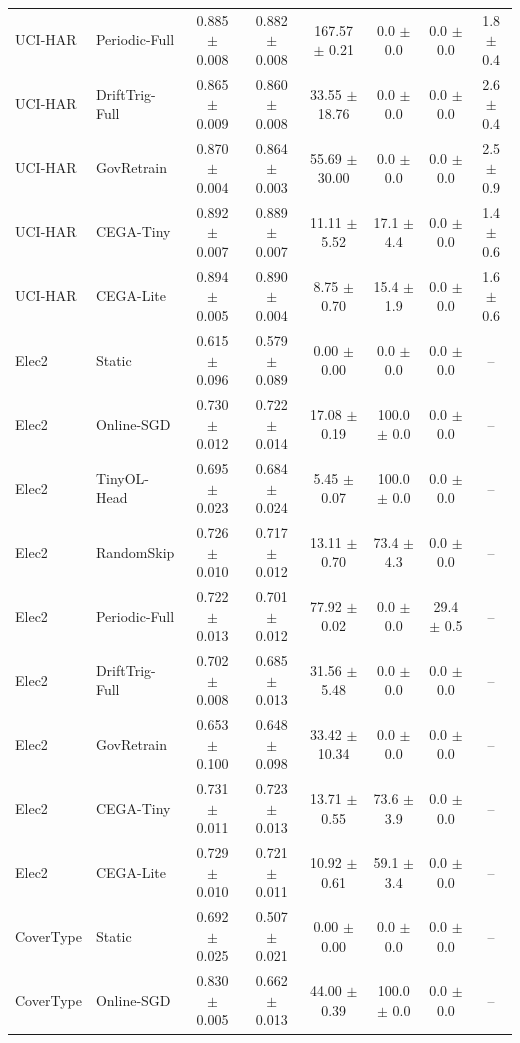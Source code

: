 \begin{table}[t]
{\begin{tabular}{llcccccc}
UCI-HAR & Periodic-Full & 0.885 $\pm$ 0.008 & 0.882 $\pm$ 0.008 & 167.57 $\pm$ 0.21 & 0.0 $\pm$ 0.0 & 0.0 $\pm$ 0.0 & 1.8 $\pm$ 0.4 \\
UCI-HAR & DriftTrig-Full & 0.865 $\pm$ 0.009 & 0.860 $\pm$ 0.008 & 33.55 $\pm$ 18.76 & 0.0 $\pm$ 0.0 & 0.0 $\pm$ 0.0 & 2.6 $\pm$ 0.4 \\
UCI-HAR & GovRetrain & 0.870 $\pm$ 0.004 & 0.864 $\pm$ 0.003 & 55.69 $\pm$ 30.00 & 0.0 $\pm$ 0.0 & 0.0 $\pm$ 0.0 & 2.5 $\pm$ 0.9 \\
UCI-HAR & CEGA-Tiny & 0.892 $\pm$ 0.007 & 0.889 $\pm$ 0.007 & 11.11 $\pm$ 5.52 & 17.1 $\pm$ 4.4 & 0.0 $\pm$ 0.0 & 1.4 $\pm$ 0.6 \\
UCI-HAR & CEGA-Lite & 0.894 $\pm$ 0.005 & 0.890 $\pm$ 0.004 & 8.75 $\pm$ 0.70 & 15.4 $\pm$ 1.9 & 0.0 $\pm$ 0.0 & 1.6 $\pm$ 0.6 \\
\midrule
Elec2 & Static & 0.615 $\pm$ 0.096 & 0.579 $\pm$ 0.089 & 0.00 $\pm$ 0.00 & 0.0 $\pm$ 0.0 & 0.0 $\pm$ 0.0 & -- \\
Elec2 & Online-SGD & 0.730 $\pm$ 0.012 & 0.722 $\pm$ 0.014 & 17.08 $\pm$ 0.19 & 100.0 $\pm$ 0.0 & 0.0 $\pm$ 0.0 & -- \\
Elec2 & TinyOL-Head & 0.695 $\pm$ 0.023 & 0.684 $\pm$ 0.024 & 5.45 $\pm$ 0.07 & 100.0 $\pm$ 0.0 & 0.0 $\pm$ 0.0 & -- \\
Elec2 & RandomSkip & 0.726 $\pm$ 0.010 & 0.717 $\pm$ 0.012 & 13.11 $\pm$ 0.70 & 73.4 $\pm$ 4.3 & 0.0 $\pm$ 0.0 & -- \\
Elec2 & Periodic-Full & 0.722 $\pm$ 0.013 & 0.701 $\pm$ 0.012 & 77.92 $\pm$ 0.02 & 0.0 $\pm$ 0.0 & 29.4 $\pm$ 0.5 & -- \\
Elec2 & DriftTrig-Full & 0.702 $\pm$ 0.008 & 0.685 $\pm$ 0.013 & 31.56 $\pm$ 5.48 & 0.0 $\pm$ 0.0 & 0.0 $\pm$ 0.0 & -- \\
Elec2 & GovRetrain & 0.653 $\pm$ 0.100 & 0.648 $\pm$ 0.098 & 33.42 $\pm$ 10.34 & 0.0 $\pm$ 0.0 & 0.0 $\pm$ 0.0 & -- \\
Elec2 & CEGA-Tiny & 0.731 $\pm$ 0.011 & 0.723 $\pm$ 0.013 & 13.71 $\pm$ 0.55 & 73.6 $\pm$ 3.9 & 0.0 $\pm$ 0.0 & -- \\
Elec2 & CEGA-Lite & 0.729 $\pm$ 0.010 & 0.721 $\pm$ 0.011 & 10.92 $\pm$ 0.61 & 59.1 $\pm$ 3.4 & 0.0 $\pm$ 0.0 & -- \\
\midrule
CoverType & Static & 0.692 $\pm$ 0.025 & 0.507 $\pm$ 0.021 & 0.00 $\pm$ 0.00 & 0.0 $\pm$ 0.0 & 0.0 $\pm$ 0.0 & -- \\
CoverType & Online-SGD & 0.830 $\pm$ 0.005 & 0.662 $\pm$ 0.013 & 44.00 $\pm$ 0.39 & 100.0 $\pm$ 0.0 & 0.0 $\pm$ 0.0 & -- \\

\end{tabular}}
\end{table}
